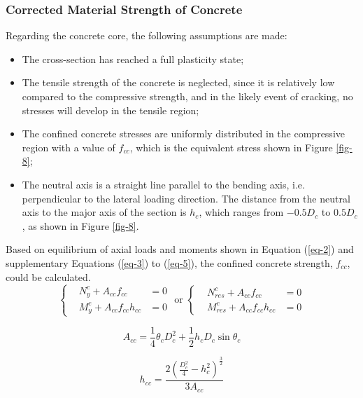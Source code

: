 \documentclass[12pt,a4]{article}
\begin{document}
	\subsubsection{Corrected Material Strength of Concrete}
	Regarding the concrete core, the following assumptions are made:
	\begin{itemize}
		\item The cross-section has reached a full plasticity state;
		
		\item The tensile strength of the concrete is neglected, since it is relatively low compared to the compressive strength, and in the likely event of cracking, no stresses will develop in the tensile region;
		
		\item The confined concrete stresses are uniformly distributed in the compressive region with a value of $f_{cc}$, which is the equivalent stress shown in Figure \ref{fig-8};
		
		\item The neutral axis is a straight line parallel to the bending axis, i.e. perpendicular to the lateral loading direction. The distance from the neutral axis to the major axis of the section is $h_c$, which ranges from $−0.5D_c$ to $0.5D_c$, as shown in Figure \ref{fig-8}.
	\end{itemize}
	Based on equilibrium of axial loads and moments shown in Equation (\ref{eq-2}) and supplementary Equations (\ref{eq-3}) to (\ref{eq-5}), the confined concrete strength, $f_{cc}$, could be calculated.
	\begin{equation}\label{eq-2}
	\left\{
	\begin{aligned}
	&N_y^c + A_{cc}f_{cc}  & = 0\\
	&M_y^c + A_{cc}f_{cc}h_{cc} & = 0
	\end{aligned}
	\right.
	\textrm{ or }
	\left\{
	\begin{aligned}
	&N_{res}^c + A_{cc}f_{cc} & = 0\\
	&M_{res}^c + A_{cc}f_{cc}h_{cc} & = 0
	\end{aligned}
	\right.
	\end{equation}
	
	\begin{equation}\label{eq-3}
	A_{cc} = \frac{1}{4}\theta_{c}D_{c}^2 + \dfrac{1}{2}h_cD_c\sin\theta_c
	\end{equation}
	
	\begin{equation}\label{eq-4}
	h_{cc} = \frac{2(\frac{D_c^2}{4} - h_c^2)^\frac{3}{2}}{3A_{cc}}
	\end{equation}
	
\end{document}
